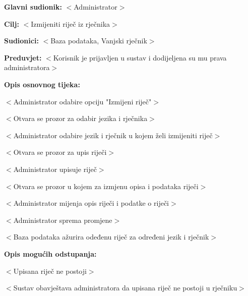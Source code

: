 					\noindent {}
					\begin{packed_item}
	
						\item \textbf{Glavni sudionik: }$<$Administrator$>$
						\item  \textbf{Cilj:} $<$Izmijeniti riječ iz rječnika$>$
						\item  \textbf{Sudionici:} $<$Baza podataka, Vanjski rječnik$>$
						\item  \textbf{Preduvjet:} $<$Korisnik je prijavljen u sustav i dodijeljena su mu prava administratora$>$
						\item  \textbf{Opis osnovnog tijeka:}
						
						\item[] \begin{packed_enum}
	
							\item $<$Administrator odabire opciju "Izmijeni riječ"$>$
							\item $<$Otvara se prozor za odabir jezika i rječnika$>$
							\item $<$Administrator odabire jezik i rječnik u kojem želi izmijeniti riječ$>$
							\item $<$Otvara se prozor za upis riječi$>$
							\item $<$Administrator upisuje riječ$>$
							\item $<$Otvara se prozor u kojem za izmjenu opisa i podataka riječi$>$
							\item $<$Administrator mijenja opis riječi i podatke o riječi$>$
							\item $<$Administrator sprema promjene$>$
							\item $<$Baza podataka ažurira odeđenu riječ za određeni jezik i rječnik$>$
						\end{packed_enum}

						\item  \textbf{Opis mogućih odstupanja:}
						
						\item[] \begin{packed_item}
	
							\item[5.a] $<$Upisana riječ ne postoji$>$
							\item[] \begin{packed_enum}
								
								\item $<$Sustav obavještava administratora da upisana riječ ne postoji u rječniku$>$
								

\end{packed_enum}
\end{packed_item}
\end{packed_item}
